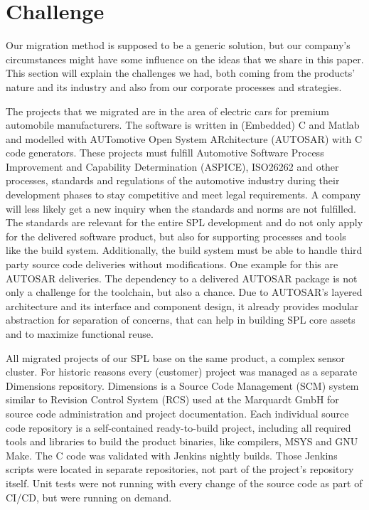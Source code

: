 \section{Challenge}\label{challenge}

Our migration method is supposed to be a generic solution, but our company's
circumstances might have some influence on the ideas that we share in this
paper. This section will explain the challenges we had, both coming from the
products' nature and its industry and also from our corporate processes and
strategies.

The projects that we migrated are in the area of electric cars for premium
automobile manufacturers. The software is written in (Embedded) C and Matlab and
modelled with AUTomotive Open System ARchitecture (AUTOSAR) with C code
generators. These projects must fulfill Automotive Software Process Improvement
and Capability Determination (ASPICE), ISO26262 and other processes, standards
and regulations of the automotive industry during their development phases to
stay competitive and meet legal requirements. A company will less likely get a
new inquiry when the standards and norms are not fulfilled. The standards are
relevant for the entire SPL development and do not only apply for the delivered
software product, but also for supporting processes and tools like the build
system. Additionally, the build system must be able to handle third party source
code deliveries without modifications. One example for this are AUTOSAR
deliveries. The dependency to a delivered AUTOSAR package is not only a
challenge for the toolchain, but also a chance. Due to AUTOSAR's layered
architecture and its interface and component design, it already provides modular
abstraction for separation of concerns, that can help in building SPL core
assets and to maximize functional reuse.

All migrated projects of our SPL base on the same product, a complex sensor
cluster. For historic reasons every (customer) project was managed as a separate
Dimensions repository. Dimensions is a Source Code Management (SCM) system
similar to Revision Control System (RCS) used at the Marquardt GmbH for source
code administration and project documentation. Each individual source code
repository is a self-contained ready-to-build project, including all required
tools and libraries to build the product binaries, like compilers, MSYS and GNU
Make. The C code was validated with Jenkins nightly builds. Those Jenkins
scripts were located in separate repositories, not part of the project's
repository itself. Unit tests were not running with every change of the source
code as part of CI/CD, but were running on demand.


